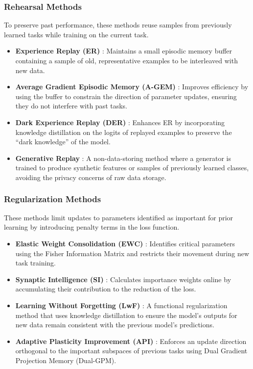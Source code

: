\subsubsection{Rehearsal Methods}
To preserve past performance, these methods reuse samples from previously learned tasks while training on the current task.
\begin{itemize}
	\item \textbf{Experience Replay (ER)} \cite{Chaudhry2019ContinualLW}: Maintains a small episodic memory buffer containing a sample of old, representative examples to be interleaved with new data.
	\item \textbf{Average Gradient Episodic Memory (A-GEM)} \cite{agem}: Improves efficiency by using the buffer to constrain the direction of parameter updates, ensuring they do not interfere with past tasks.
	\item \textbf{Dark Experience Replay (DER)} \cite{buzzega2020darkexperiencegeneralcontinual}: Enhances ER by incorporating knowledge distillation on the logits of replayed examples to preserve the ``dark knowledge'' of the model.
	\item \textbf{Generative Replay} \cite{generative_features}: A non-data-storing method where a generator is trained to produce synthetic features or samples of previously learned classes, avoiding the privacy concerns of raw data storage.
\end{itemize}

\subsubsection{Regularization Methods}
These methods limit updates to parameters identified as important for prior learning by introducing penalty terms in the loss function.
\begin{itemize}
	\item \textbf{Elastic Weight Consolidation (EWC)} \cite{Kirkpatrick_2017}: Identifies critical parameters using the Fisher Information Matrix and restricts their movement during new task training.
	\item \textbf{Synaptic Intelligence (SI)} \cite{zenke2017continuallearningsynapticintelligence}: Calculates importance weights online by accumulating their contribution to the reduction of the loss.
	\item \textbf{Learning Without Forgetting (LwF)} \cite{li2017learningforgetting}: A functional regularization method that uses knowledge distillation to ensure the model's outputs for new data remain consistent with the previous model's predictions.
	\item \textbf{Adaptive Plasticity Improvement (API)} \cite{API}: Enforces an update direction orthogonal to the important subspaces of previous tasks using Dual Gradient Projection Memory (Dual-GPM).
\end{itemize}

